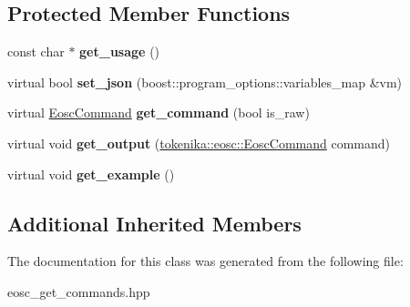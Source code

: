 \subsection*{Protected Member Functions}
\begin{DoxyCompactItemize}
\item 
\mbox{\label{classtokenika_1_1eosc_1_1_get_info_options_a05dff84e787d0de8a868675a1c4bdaf7}} 
const char $\ast$ {\bfseries get\+\_\+usage} ()
\item 
\mbox{\label{classtokenika_1_1eosc_1_1_get_info_options_a1e9442163033df583c0e88a8bb7e2449}} 
virtual bool {\bfseries set\+\_\+json} (boost\+::program\+\_\+options\+::variables\+\_\+map \&vm)
\item 
\mbox{\label{classtokenika_1_1eosc_1_1_get_info_options_a86c644c64a49731a043e28cef9d1c4d3}} 
virtual \hyperlink{classtokenika_1_1eosc_1_1_eosc_command}{Eosc\+Command} {\bfseries get\+\_\+command} (bool is\+\_\+raw)
\item 
\mbox{\label{classtokenika_1_1eosc_1_1_get_info_options_ac5ed969c967312b99027f5ef8b8ae447}} 
virtual void {\bfseries get\+\_\+output} (\hyperlink{classtokenika_1_1eosc_1_1_eosc_command}{tokenika\+::eosc\+::\+Eosc\+Command} command)
\item 
\mbox{\label{classtokenika_1_1eosc_1_1_get_info_options_af7a45f9570c6dd7903e1ab525cc36487}} 
virtual void {\bfseries get\+\_\+example} ()
\end{DoxyCompactItemize}
\subsection*{Additional Inherited Members}


The documentation for this class was generated from the following file\+:\begin{DoxyCompactItemize}
\item 
eosc\+\_\+get\+\_\+commands.\+hpp\end{DoxyCompactItemize}
